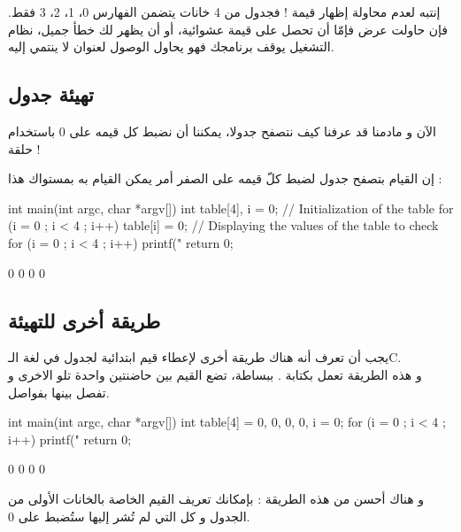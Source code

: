 \begin{critical}
  إنتبه لعدم محاولة إظهار قيمة
 !
فجدول من 4 خانات يتضمن الفهارس 0، 1، 2، 3 فقط. فإن حاولت عرض
فإمّا أن تحصل على قيمة عشوائية، أو أن يظهر لك خطأ جميل، نظام التشغيل يوقف برنامجك فهو يحاول الوصول لعنوان لا ينتمي إليه.
\end{critical}

\subsection{تهيئة جدول}

الآن و مادمنا قد عرفنا كيف نتصفح جدولا، يمكننا أن نضبط كل قيمه على 0 باستخدام حلقة !

إن القيام بتصفح جدول لضبط كلّ قيمه على الصفر أمر يمكن القيام به بمستواك هذا :

\begin{Csource}
int main(int argc, char *argv[])
{
	int table[4], i = 0;
	// Initialization of the table
	for (i = 0 ; i < 4 ; i++)
	{
    		table[i] = 0;
	}
	// Displaying the values of the table to check
	for (i = 0 ; i < 4 ; i++)
	{
    		printf("%
	}
	return 0;
}
\end{Csource}

\begin{Console}
0
0
0
0
\end{Console}

\subsection{طريقة أخرى للتهيئة}

يجب أن تعرف أنه هناك طريقة أخرى لإعطاء قيم ابتدائية لجدول في لغة الـ\textenglish{C}.\\
و هذه الطريقة تعمل بكتابة
.
ببساطة، تضع القيم بين حاضنتين واحدة تلو الاخرى و تفصل بينها بفواصل.

\begin{Csource}
int main(int argc, char *argv[])
{
	int table[4] = {0, 0, 0, 0}, i = 0;
	for (i = 0 ; i < 4 ; i++)
	{
    	printf("%
	}
	return 0;
}
\end{Csource}

\begin{Console}
0
0
0
0
\end{Console}

و هناك أحسن من هذه الطريقة : بإمكانك تعريف القيم الخاصة بالخانات الأولى من الجدول و كل التي لم تُشر إليها ستُضبط على 0.

